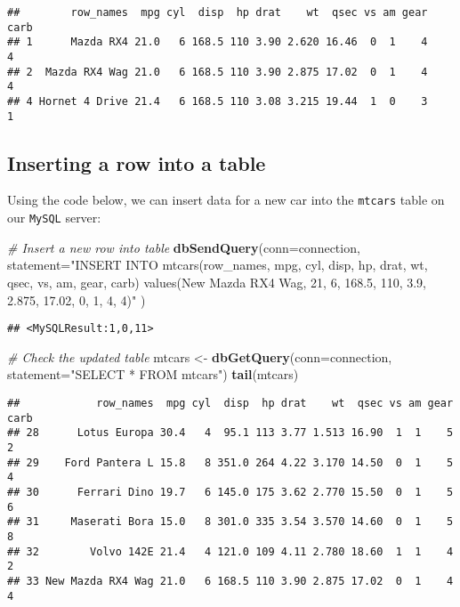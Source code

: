 \documentclass[
]{article}
\newenvironment{Shaded}{\begin{snugshade}}{\end{snugshade}}
\newcommand{\CommentTok}[1]{\textcolor[rgb]{0.56,0.35,0.01}{\textit{#1}}}
\newcommand{\DataTypeTok}[1]{\textcolor[rgb]{0.13,0.29,0.53}{#1}}
\newcommand{\KeywordTok}[1]{\textcolor[rgb]{0.13,0.29,0.53}{\textbf{#1}}}
\newcommand{\NormalTok}[1]{#1}
\newcommand{\StringTok}[1]{\textcolor[rgb]{0.31,0.60,0.02}{#1}}
\begin{document}
\begin{verbatim}
##        row_names  mpg cyl  disp  hp drat    wt  qsec vs am gear carb
## 1      Mazda RX4 21.0   6 168.5 110 3.90 2.620 16.46  0  1    4    4
## 2  Mazda RX4 Wag 21.0   6 168.5 110 3.90 2.875 17.02  0  1    4    4
## 4 Hornet 4 Drive 21.4   6 168.5 110 3.08 3.215 19.44  1  0    3    1
\end{verbatim}

\hypertarget{inserting-a-row-into-a-table}{%
\subsection{Inserting a row into a
table}\label{inserting-a-row-into-a-table}}

Using the code below, we can insert data for a new car into the
\texttt{mtcars} table on our \texttt{MySQL} server:

\begin{Shaded}
\begin{Highlighting}[]
\CommentTok{\# Insert a new row into table}
\KeywordTok{dbSendQuery}\NormalTok{(}\DataTypeTok{conn=}\NormalTok{connection,}
            \DataTypeTok{statement=}\StringTok{"INSERT INTO mtcars(row\_names, mpg, cyl, disp, hp, drat, wt, qsec, vs, am, gear, carb) values(\textquotesingle{}New Mazda RX4 Wag\textquotesingle{}, 21, 6, 168.5, 110, 3.9, 2.875, 17.02, 0, 1, 4, 4)"}
\NormalTok{            )}
\end{Highlighting}
\end{Shaded}

\begin{verbatim}
## <MySQLResult:1,0,11>
\end{verbatim}

\begin{Shaded}
\begin{Highlighting}[]
\CommentTok{\# Check the updated table}
\NormalTok{mtcars \textless{}{-}}\StringTok{ }\KeywordTok{dbGetQuery}\NormalTok{(}\DataTypeTok{conn=}\NormalTok{connection, }\DataTypeTok{statement=}\StringTok{"SELECT * FROM mtcars"}\NormalTok{)}
\KeywordTok{tail}\NormalTok{(mtcars)}
\end{Highlighting}
\end{Shaded}

\begin{verbatim}
##            row_names  mpg cyl  disp  hp drat    wt  qsec vs am gear carb
## 28      Lotus Europa 30.4   4  95.1 113 3.77 1.513 16.90  1  1    5    2
## 29    Ford Pantera L 15.8   8 351.0 264 4.22 3.170 14.50  0  1    5    4
## 30      Ferrari Dino 19.7   6 145.0 175 3.62 2.770 15.50  0  1    5    6
## 31     Maserati Bora 15.0   8 301.0 335 3.54 3.570 14.60  0  1    5    8
## 32        Volvo 142E 21.4   4 121.0 109 4.11 2.780 18.60  1  1    4    2
## 33 New Mazda RX4 Wag 21.0   6 168.5 110 3.90 2.875 17.02  0  1    4    4
\end{verbatim}
\end{document}
